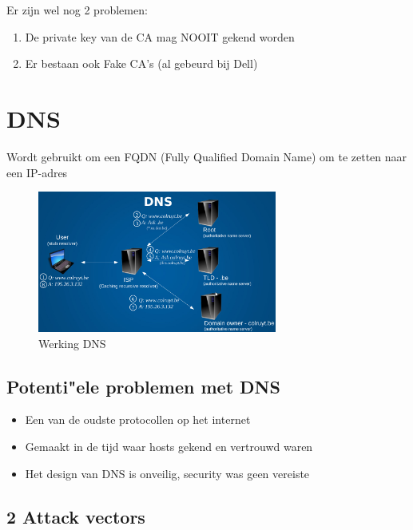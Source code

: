 \documentclass{article}
\begin{document}
Er zijn wel nog 2 problemen:

\begin{enumerate}
    \item De private key van de CA mag NOOIT gekend worden
    \item Er bestaan ook Fake CA's (al gebeurd bij Dell)
\end{enumerate}

\section{DNS}

Wordt gebruikt om een FQDN (Fully Qualified Domain Name) om te zetten naar een IP-adres

\begin{figure}[H]
    \centering
    \includegraphics[width=0.7\textwidth]{dns.png}
    \caption{Werking DNS}
\end{figure}


\subsection{Potenti"ele problemen met DNS}

\begin{itemize}
    \item Een van de oudste protocollen op het internet
    \item Gemaakt in de tijd waar hosts gekend en vertrouwd waren
    \item Het design van DNS is onveilig, security was geen vereiste
\end{itemize}

\subsection{2 Attack vectors}
\end{document}
